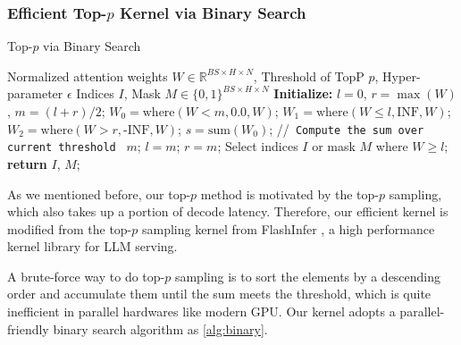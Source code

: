 
\subsubsection{Efficient Top-$p$ Kernel via Binary Search}

\begin{algorithm}[tb]
   \caption{Top-$p$ via Binary Search}
   \label{alg:binary}
\begin{algorithmic}
    Normalized attention weights $W \in \mathbb{R}^{BS \times H \times N}$, Threshold of TopP $p$, Hyper-parameter $\epsilon$
    Indices $I$, Mask $M \in \{0, 1\}^{BS \times H \times N}$
   \STATE \textbf{Initialize:} $l = 0$, $r = \max(W)$, $m = (l + r) / 2$;
   \REPEAT
   \STATE $W_0 =\text{where}(W < m, 0.0, W)$;
   \STATE $W_1 =\text{where}(W \le l, \text{INF}, W)$;
   \STATE $W_2 =\text{where}(W > r, \text{-INF}, W)$;
   \STATE $s=\text{sum}(W_0)$; //\texttt{ Compute the sum over current threshold } $m$;
   \STATE $l = m$;
   \ELSE
   \STATE $r = m$;
   \ENDIF
   \STATE Select indices $I$ or mask $M$ where $W \ge l$;
   \STATE \textbf{return }{$I$, $M$};
\end{algorithmic}
\end{algorithm}

As we mentioned before, our top-$p$ method is motivated by the top-$p$ sampling, which also takes up a portion of decode latency. Therefore, our efficient kernel is modified from the top-$p$ sampling kernel from FlashInfer \cite{ye2025flashinfer}, a high performance kernel library for LLM serving.

A brute-force way to do top-$p$ sampling is to sort the elements by a descending order and accumulate them until the sum meets the threshold, which is quite inefficient in parallel hardwares like modern GPU. Our kernel adopts a parallel-friendly binary search algorithm as \cref{alg:binary}.


